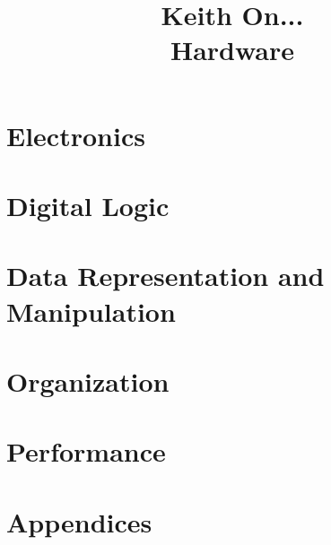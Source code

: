 \documentclass[]{book}
\title{
{\Large Keith On...} \\
{\huge Hardware}
}
\author{
  
}
\date{}
\begin{document}
\normalbaselineskip

\maketitle

\tableofcontents



\part{Electronics}







\part{Digital Logic}





\part{Data Representation and Manipulation}



\part{Organization}









\part{Performance}






\part{Appendices}
\appendix












\end{document}
